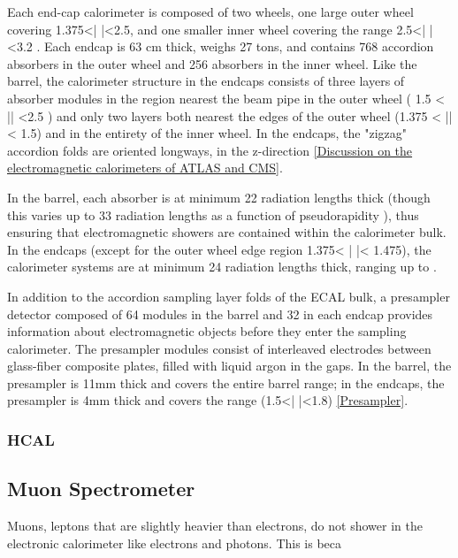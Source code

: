 Each end-cap calorimeter is composed of two wheels, one large outer wheel covering 1.375<| \eta |<2.5, and one smaller inner wheel covering the range 2.5<| \eta |<3.2 . Each endcap is 63 cm thick, weighs 27 tons, and contains 768 accordion absorbers in the outer wheel and 256 absorbers in the inner wheel. Like the barrel, the calorimeter structure in the endcaps consists of three layers of absorber modules in the region nearest the beam pipe in the outer wheel ( 1.5 < |\eta | <2.5 ) and only two layers both nearest the edges of the outer wheel (1.375 < |\eta | < 1.5) and in the entirety of the inner wheel. In the endcaps, the "zigzag" accordion folds are oriented longways, in the z-direction \ref{Discussion on the electromagnetic calorimeters of ATLAS and CMS}.

In the barrel, each absorber is at minimum 22 radiation lengths thick (though this varies up to 33 radiation lengths as a function of pseudorapidity \eta), thus ensuring that electromagnetic showers are contained within the calorimeter bulk. In the endcaps (except for the outer wheel edge region  1.375< | \eta |< 1.475), the calorimeter systems are at minimum 24 radiation lengths thick, ranging up to .

In addition to the accordion sampling layer folds of the ECAL bulk, a presampler detector composed of 64 modules in the barrel and 32 in each endcap provides information about electromagnetic objects before they enter the sampling calorimeter. The presampler modules consist of interleaved electrodes between glass-fiber composite plates, filled with liquid argon in the gaps. In the barrel, the presampler is 11mm thick and covers the entire barrel range; in the endcaps, the presampler is 4mm thick and covers the range (1.5<| \eta |<1.8) \ref{Presampler}.

\subsubsection{HCAL} \label{sec:HCAL} 






\subsection{Muon Spectrometer} \label{sec:Musyst}
 
Muons, leptons that are slightly heavier than electrons, do not shower in the electronic calorimeter like electrons and photons. This is beca





